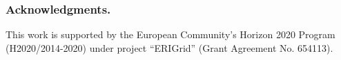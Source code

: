 \documentclass[runningheads,a4paper]{llncs}
\begin{document}
\subsubsection*{Acknowledgments.} This work is supported by the European Community’s Horizon 2020 Program (H2020/2014-2020) under project ``ERIGrid'' (Grant Agreement No. 654113). 
%
%


%
\end{document}
